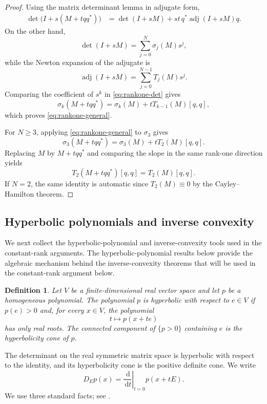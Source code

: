 \documentclass{article}
\newtheorem{definition}[theorem]{Definition}
\newcommand{\dd}{\,\mathrm d}
\numberwithin{equation}{section}
\begin{document}
\begin{proof}
Using the matrix determinant lemma in adjugate form,
\begin{align}
\det\bigl(I+s(M+tqq^*)\bigr)
&=
\det(I+sM)
+st\,q^*\operatorname{adj}(I+sM)q.
\label{eq:rankone-det}
\end{align}
On the other hand,
\begin{equation}\label{eq:det-generating}
\det(I+sM)
=
\sum_{j=0}^N \sigma_j(M)s^j,
\end{equation}
while the Newton expansion of the adjugate is
\begin{equation}\label{eq:adj-newton}
\operatorname{adj}(I+sM)
=
\sum_{j=0}^{N-1}T_j(M)s^j.
\end{equation}
Comparing the coefficient of $s^k$ in
\eqref{eq:rankone-det} gives
\[
\sigma_k(M+tqq^*)
=
\sigma_k(M)
+tT_{k-1}(M)[q,q],
\]
which proves \eqref{eq:rankone-general}.

For $N\ge3$, applying \eqref{eq:rankone-general} to $\sigma_3$ gives
\[
\sigma_3(M+tqq^*)
=
\sigma_3(M)
+tT_2(M)[q,q].
\]
Replacing $M$ by $M+tqq^*$ and comparing the slope in the same rank-one
direction yields
\[
T_2(M+tqq^*)[q,q]
=
T_2(M)[q,q].
\]
If $N=2$, the same identity is automatic since $T_2(M)\equiv0$ by the
Cayley--Hamilton theorem.
\end{proof}

\subsection{Hyperbolic polynomials and inverse convexity}

We next collect the hyperbolic-polynomial and inverse-convexity tools
used in the constant-rank arguments. The hyperbolic-polynomial results
below provide the algebraic mechanism behind the inverse-convexity
theorems that will be used in the constant-rank argument below.

\begin{definition}\label{def:hyperbolic}
Let $V$ be a finite-dimensional real vector space and let $p$ be a homogeneous polynomial. The polynomial $p$ is \emph{hyperbolic with respect to} $e\in V$ if $p(e)>0$ and, for every $x\in V$, the polynomial
\[
t\longmapsto p(x+te)
\]
has only real roots. The connected component of $\{p>0\}$ containing $e$ is the hyperbolicity cone of $p$.
\end{definition}

The determinant on the real symmetric matrix space is hyperbolic with respect to the identity, and its hyperbolicity cone is the positive definite cone. We write
\[
D_Ep(x)=\left.\frac{\dd}{\dd t}\right|_{t=0}p(x+tE).
\]
We use three standard facts; see \cite{Garding59,BGLS01,Renegar06}.
\end{document}
